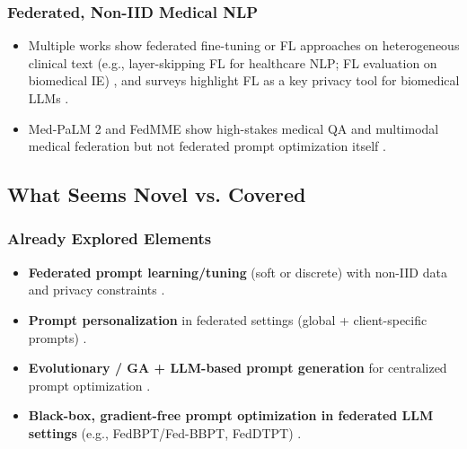 \subsubsection*{\textbf{Federated, Non-IID Medical NLP}}


\begin{itemize}
\item Multiple works show federated fine-tuning or FL approaches on heterogeneous clinical text (e.g., layer-skipping FL for healthcare NLP; FL evaluation on biomedical IE)  \cite{Jiang2025Fine-tuning} \cite{Wang2025Multi-Modal}, and surveys highlight FL as a key privacy tool for biomedical LLMs  \cite{Peng2024An}.
\item Med-PaLM 2 and FedMME show high-stakes medical QA and multimodal medical federation but not federated prompt optimization itself  \cite{Guo2023Connecting} \cite{Li2026Evolutionary-Algorithm-Based}.
\end{itemize}


\subsection*{What Seems Novel vs. Covered}


\subsubsection*{\textbf{Already Explored Elements}}


\begin{itemize}
\item \textbf{Federated prompt learning/tuning} (soft or discrete) with non-IID data and privacy constraints  \cite{Sun2023FedBPT:} \cite{Zhao2022FedPrompt:} \cite{Lin2023Efficient} \cite{Wu2024FedDTPT:} \cite{Guo2023EvoPrompt:} \cite{Singhal2025Toward} \cite{Abdolmaleki2025Sync-GWO:}.
\item \textbf{Prompt personalization} in federated settings (global + client-specific prompts)  \cite{Tran2025Privacy-Preserving} \cite{Singhal2025Toward} \cite{Abdolmaleki2025Sync-GWO:}.
\item \textbf{Evolutionary / GA + LLM-based prompt generation} for centralized prompt optimization  \cite{Weng2025Probabilistic} \cite{S'echeresse2025GAAPO:} \cite{Guo2022PromptFL:}.
\item \textbf{Black-box, gradient-free prompt optimization in federated LLM settings} (e.g., FedBPT/Fed-BBPT, FedDTPT)  \cite{Sun2023FedBPT:} \cite{Li2024Federated} \cite{Lin2023Efficient} \cite{Wu2024FedDTPT:}.
\end{itemize}



